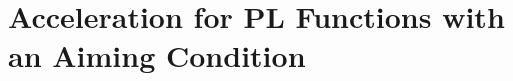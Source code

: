 \documentclass{article}
\newcommand{\jh}[1]{{\color{red} #1}}
\def\pl{{\text{PL}^\mu}}
\newcommand{\sqc}{\text{SQC}_{\tau}^{\mu}}
\newcommand{\ac}{\text{AC}^{a}}
\newcommand{\sqcf}[2]{\text{SQC}_{#1}^{#2}}
\theoremstyle{plain}
\newtheorem{theorem}{Theorem}[section]
\theoremstyle{definition}
\theoremstyle{remark}
\begin{document}








\section{Acceleration for PL Functions with an Aiming Condition}\label{sec:cv_results}

\end{document}
